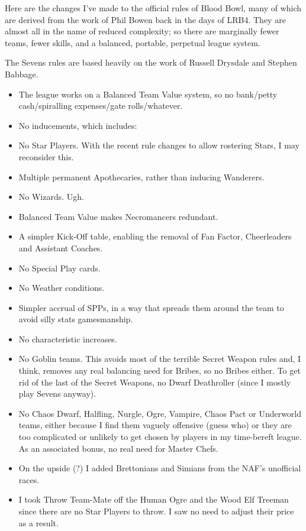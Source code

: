\documentclass{article}
\begin{document}
\begin{multicols}{2}

\par Here are the changes I've made to the official rules of Blood Bowl, many of which are derived from the work of Phil Bowen back in the days of LRB4. They are almost all in the name of reduced complexity; so there are marginally fewer teams, fewer skills, and a balanced, portable, perpetual league system.
\par The Sevens rules are based heavily on the work of Russell Drysdale and Stephen Babbage.

\begin{itemize}
\item The league works on a Balanced Team Value system, so no bank/petty cash/spiralling expenses/gate rolls/whatever.
\item No inducements, which includes:
\item No Star Players. With the recent rule changes to allow rostering Stars, I may reconsider this.
\item Multiple permanent Apothecaries, rather than inducing Wanderers.
\item No Wizards. Ugh.
\item Balanced Team Value makes Necromancers redundant.
\item A simpler Kick-Off table, enabling the removal of Fan Factor, Cheerleaders and Assistant Coaches.
\item No Special Play cards.
\item No Weather conditions.
\item Simpler accrual of SPPs, in a way that spreads them around the team to avoid silly stats gamesmanship.
\item No characteristic increases.
\item No Goblin teams. This avoids most of the terrible Secret Weapon rules and, I think, removes any real balancing need for Bribes, so no Bribes either. To get rid of the last of the Secret Weapons, no Dwarf Deathroller (since I mostly play Sevens anyway).
\item No Chaos Dwarf, Halfling, Nurgle, Ogre, Vampire, Chaos Pact or Underworld teams, either because I find them vaguely offensive (guess who) or they are too complicated or unlikely to get chosen by players in my time-bereft league. As an associated bonus, no real need for Master Chefs.
\item On the upside (?) I added Brettonians and Simians from the NAF's unofficial races.
\item I took Throw Team-Mate off the Human Ogre and the Wood Elf Treeman since there are no Star Players to throw. I saw no need to adjust their price as a result.

\end{itemize}
\end{multicols}
\end{document}
